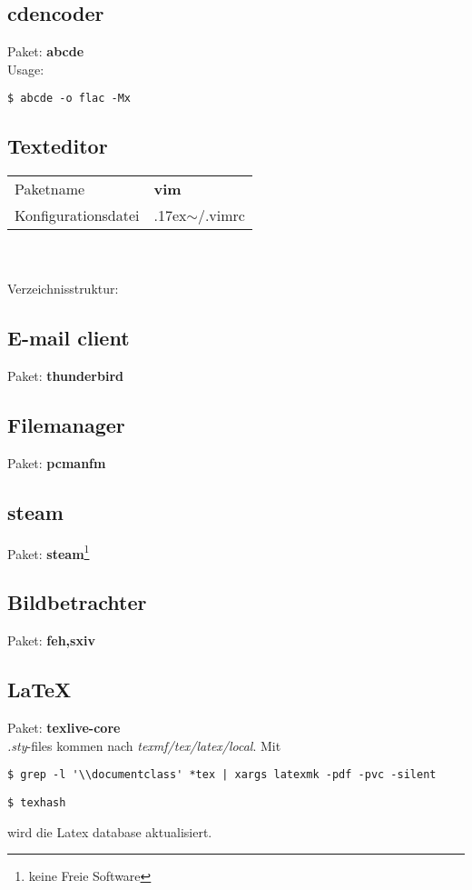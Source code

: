 \subsection{cdencoder}
Paket: \textbf{abcde}  \\ 
Usage:
\begin{lstlisting}[style=Bash]
$ abcde -o flac -Mx
\end{lstlisting}

\subsection{Texteditor}
\begin{tabular}{l|l}
Paketname & \textbf{vim} \\ 
Konfigurationsdatei & {{\raise.17ex\hbox{$\scriptstyle\mathtt{\sim}$}}/.vimrc} \\
\end{tabular}
\\ \\
Verzeichnisstruktur:  

\subsection{E-mail client}
Paket: \textbf{thunderbird}

\subsection{Filemanager}
Paket: \textbf{pcmanfm} 

\subsection{steam}
Paket: \textbf{steam}\footnote{keine Freie Software} 

\subsection{Bildbetrachter}
Paket: \textbf{feh,sxiv}

\subsection{\LaTeX}
Paket: \textbf{texlive-core} \\
\emph{.sty}-files kommen nach \emph{texmf/tex/latex/local}.
Mit 
\begin{lstlisting}[style=Bash]
$ grep -l '\\documentclass' *tex | xargs latexmk -pdf -pvc -silent
\end{lstlisting}
\begin{lstlisting}[style=Bash]
$ texhash
\end{lstlisting}
wird die Latex database aktualisiert.
